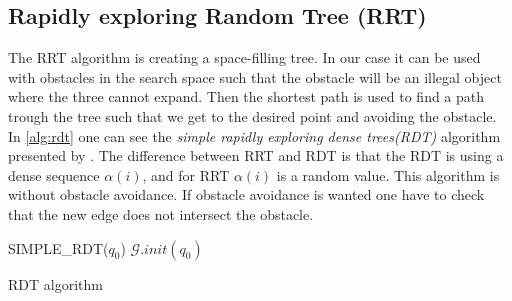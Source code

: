 \subsection{Rapidly exploring Random Tree (RRT)}
The RRT algorithm is creating a space-filling tree. In our case it can be used with obstacles in the search space such that the obstacle will be an illegal object where the three cannot expand. Then the shortest path is used to find a path trough the tree such that we get to the desired point and avoiding the obstacle. In \autoref{alg:rdt} one can see the \textit{simple rapidly exploring dense trees(RDT)} algorithm presented by \cite{Lavalle}. The difference between RRT and RDT is that the RDT is using a dense sequence $\alpha(i)$, and for RRT $\alpha(i)$ is a random value. This algorithm is without obstacle avoidance. If obstacle avoidance is wanted one have to check that the new edge does not intersect the obstacle. %
\begin{algorithm}[htbp]
 SIMPLE\_RDT($q_0$)\;
 $\mathcal{G}.init(q_0)$\;
 \caption{RDT algorithm}
 \label{alg:rdt}
\end{algorithm}

